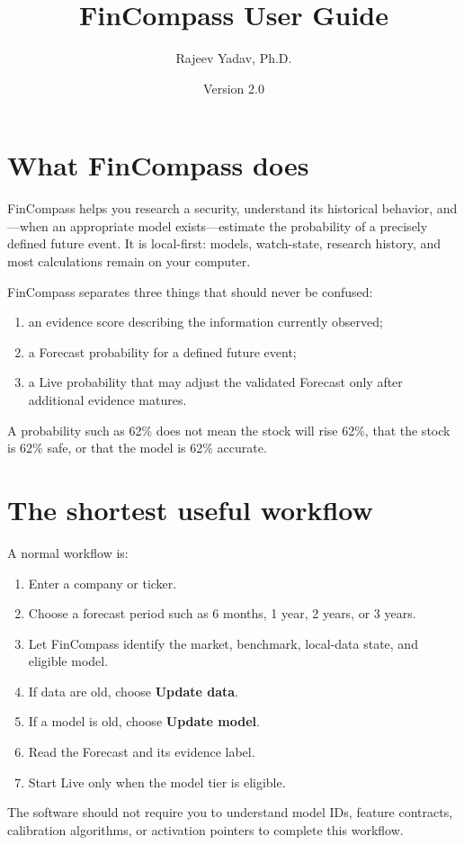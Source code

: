 \documentclass[11pt]{article}
\title{FinCompass User Guide}
\author{Rajeev Yadav, Ph.D.}
\date{Version 2.0}
\begin{document}
\maketitle
\tableofcontents
\newpage
\section{What FinCompass does}
FinCompass helps you research a security, understand its historical behavior, and---when an appropriate model exists---estimate the probability of a precisely defined future event. It is local-first: models, watch-state, research history, and most calculations remain on your computer.

FinCompass separates three things that should never be confused:
\begin{enumerate}
\item an evidence score describing the information currently observed;
\item a Forecast probability for a defined future event;
\item a Live probability that may adjust the validated Forecast only after additional evidence matures.
\end{enumerate}

A probability such as 62\% does not mean the stock will rise 62\%, that the stock is 62\% safe, or that the model is 62\% accurate.

\section{The shortest useful workflow}
A normal workflow is:
\begin{enumerate}
\item Enter a company or ticker.
\item Choose a forecast period such as 6 months, 1 year, 2 years, or 3 years.
\item Let FinCompass identify the market, benchmark, local-data state, and eligible model.
\item If data are old, choose \textbf{Update data}.
\item If a model is old, choose \textbf{Update model}.
\item Read the Forecast and its evidence label.
\item Start Live only when the model tier is eligible.
\end{enumerate}

The software should not require you to understand model IDs, feature contracts, calibration algorithms, or activation pointers to complete this workflow.
\end{document}
